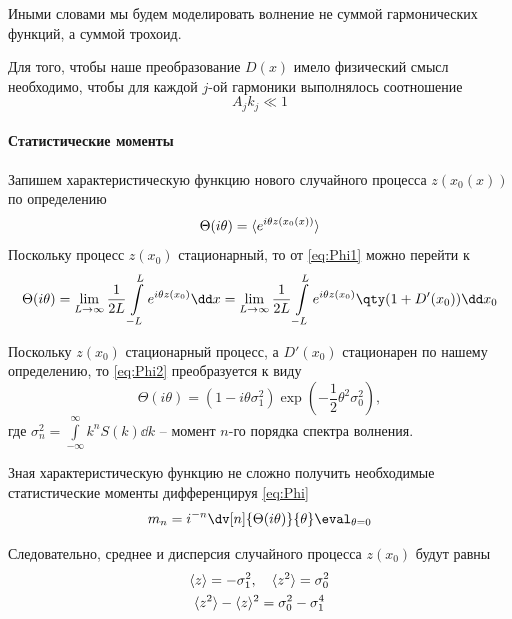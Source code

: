 Иными словами мы будем моделировать волнение не суммой гармонических функций, а 
суммой трохоид. 

Для того, чтобы наше преобразование $D(x)$ имело физический смысл
необходимо, чтобы для каждой $j$-ой гармоники выполнялось соотношение 
\begin{equation}
    A_j k_j \ll 1 
\end{equation}

\paragraph{Статистические моменты}%

Запишем характеристическую функцию нового случайного процесса $z(x_0(x))$ по
определению
 \begin{equation}
    \label{eq:Phi1}
    \Theta(i\theta) = \langle e^{i \theta z(x_0(x))}\rangle
\end{equation}
Поскольку процесс $z(x_0)$ стационарный, то от \eqref{eq:Phi1} можно перейти к
\begin{equation}
    \label{eq:Phi2}
    \Theta(i\theta) = \lim_{L \to \infty} \frac{1}{2L} \int\limits_{-L}^{L} e^{i \theta z(x_0)
    }\dd x = 
    \lim_{L \to \infty} \frac{1}{2L} \int\limits_{-L}^{L} e^{i \theta z(x_0)} \qty( 1 + D'(x_0) ) \dd x_0
\end{equation}

Поскольку $z(x_0)$ стационарный процесс, а  $D'(x_0)$ стационарен по нашему
определению, то  \eqref{eq:Phi2} преобразуется к виду
\begin{equation}
    \label{eq:Phi}
    \Theta(i\theta) = (1 - i \theta \sigma_1^2) 
    \exp(-\frac{1}{2} \theta^2 \sigma_0^2),
\end{equation}
где $\sigma^2_n = \int\limits_{-\infty}^{\infty}  k^n S(k) \dd k$ -- момент
$n$-го порядка спектра волнения.

Зная характеристическую функцию не сложно получить необходимые статистические
моменты дифференцируя \eqref{eq:Phi}
\begin{equation}
    m_n = i^{-n} \dv[n]{\Theta(i\theta)}{\theta} \eval_{\theta = 0}
\end{equation}

Следовательно, среднее и дисперсия случайного процесса $z(x_0)$ будут
равны
\begin{gather}
    \langle z\rangle = - \sigma_1^2, \quad \langle z^2\rangle = \sigma_0^2 \\
    \langle z^2\rangle - \langle z\rangle^2 = \sigma_0^2 - \sigma_1^4
\end{gather}

